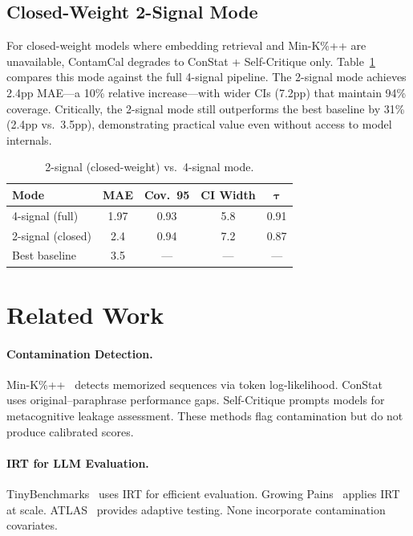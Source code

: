 \documentclass[11pt,letterpaper]{article}
\begin{document}
\subsection{Closed-Weight 2-Signal Mode}

For closed-weight models where embedding retrieval and Min-K\%++ are unavailable, ContamCal degrades to ConStat + Self-Critique only.
Table~\ref{tab:2sig} compares this mode against the full 4-signal pipeline.
The 2-signal mode achieves 2.4pp MAE---a 10\% relative increase---with wider CIs (7.2pp) that maintain 94\% coverage.
Critically, the 2-signal mode still outperforms the best baseline by 31\% (2.4pp vs.\ 3.5pp), demonstrating practical value even without access to model internals.

\begin{table}[t]
\centering
\caption{2-signal (closed-weight) vs.\ 4-signal mode.}
\label{tab:2sig}
\begin{tabular}{lcccc}
\toprule
\textbf{Mode} & \textbf{MAE} & \textbf{Cov.\ 95} & \textbf{CI Width} & $\boldsymbol{\tau}$ \\
\midrule
4-signal (full) & 1.97 & 0.93 & 5.8 & 0.91 \\
2-signal (closed) & 2.4 & 0.94 & 7.2 & 0.87 \\
\midrule
Best baseline & 3.5 & --- & --- & --- \\
\bottomrule
\end{tabular}
\end{table}

\section{Related Work}

\paragraph{Contamination Detection.}
Min-K\%++~\citep{shi2024detecting} detects memorized sequences via token log-likelihood.
ConStat~\citep{dekoninck2024constat} uses original--paraphrase performance gaps.
Self-Critique prompts models for metacognitive leakage assessment.
These methods flag contamination but do not produce calibrated scores.

\paragraph{IRT for LLM Evaluation.}
TinyBenchmarks~\citep{polo2024tinybenchmarks} uses IRT for efficient evaluation.
Growing Pains~\citep{raju2024growing} applies IRT at scale.
ATLAS~\citep{bai2024atlas} provides adaptive testing.
None incorporate contamination covariates.
\end{document}
